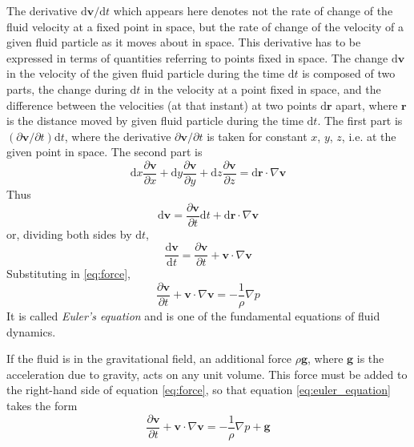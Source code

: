 \documentclass[conference]{IEEEtran}
\theoremstyle{definition}
\theoremstyle{remark}
\begin{document}
    The derivative $\mathrm{d} \mathbf{v} / \mathrm{d} t$ which appears here denotes not the rate of change of the fluid velocity at a fixed point in space, but the rate of change of the velocity of a given fluid particle as it moves about in space. This derivative has to be expressed in terms of quantities referring to points fixed in space. The change $\mathrm{d} \mathbf{v}$ in the velocity of the given fluid particle during the time $\mathrm{d} t$ is composed of two parts, the change during $\mathrm{d} t$ in the velocity at a point fixed in space, and the difference between the velocities (at that instant) at two points $\mathrm{d} \mathbf{r}$ apart, where $\mathbf{r}$ is the distance moved by given fluid particle during the time $\mathrm{d} t$. The first part is $(\partial \mathbf{v} / \partial t) \mathrm{d} t$, where the derivative $\partial \mathbf{v} / \partial t$ is taken for constant $x$, $y$, $z$, i.e. at the given point in space. The second part is
    \[
        \mathrm{d} x \dfrac{\partial \mathbf{v}}{\partial x} + \mathrm{d} y \dfrac{\partial \mathbf{v}}{\partial y} + \mathrm{d} z \dfrac{\partial \mathbf{v}}{\partial z} = \mathrm{d} \mathbf{r} \cdot \nabla \mathbf{v}
    \]
    Thus
    \[
        \mathrm{d} \mathbf{v} = \dfrac{\partial \mathbf{v}}{\partial t} \mathrm{d} t + \mathrm{d} \mathbf{r} \cdot \nabla \mathbf{v}
    \]
    or, dividing both sides by $\mathrm{d} t$,
    \[
        \dfrac{\mathrm{d} \mathbf{v}}{\mathrm{d} t} = \dfrac{\partial \mathbf{v}}{\partial t} + \mathbf{v} \cdot \nabla \mathbf{v}
    \]
    Substituting in \ref{eq:force},
    \begin{equation}
        \dfrac{\partial \mathbf{v}}{\partial t} + \mathbf{v} \cdot \nabla \mathbf{v} = -\dfrac1\rho \nabla p
        \label{eq:euler_equation}
    \end{equation}
    It is called \emph{Euler's equation} and is one of the fundamental equations of fluid dynamics.

    If the fluid is in the gravitational field, an additional force $\rho \mathbf{g}$, where $\mathbf{g}$ is the acceleration due to gravity, acts on any unit volume. This force must be added to the right-hand side of equation \ref{eq:force}, so that equation \ref{eq:euler_equation} takes the form
    \begin{equation}
        \dfrac{\partial \mathbf{v}}{\partial t} + \mathbf{v} \cdot \nabla \mathbf{v} = -\dfrac1\rho \nabla p + \mathbf{g}
        \label{eq:euler_equation_gravitational}
    \end{equation}
\end{document}
